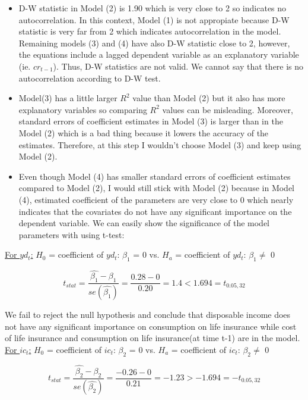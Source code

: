 \documentclass{article}
\begin{document}
\begin{itemize}
    \item D-W statistic in Model (2) is 1.90 which is very close to 2 so indicates no autocorrelation. In this context, Model (1) is not appropiate because D-W statistic is very far from 2 which indicates autocorrelation in the model. Remaining models (3) and (4) have also D-W statistic close to 2, however, the equations include a lagged dependent variable as an explanatory variable (ie. $cr_{t-1}$). Thus, D-W statistics are not valid. We cannot say that there is no autocorrelation according to D-W test. 
    \item Model(3) has a little larger $R^2$ value than Model (2) but it also has more explanatory variables so comparing $R^2$ values can be misleading. Moreover, standard errors of coefficient estimates in Model (3) is larger than in the Model (2) which is a bad thing because it lowers the accuracy of the estimates. Therefore, at this step I wouldn't choose Model (3) and keep using Model (2).
    \item Even though Model (4) has smaller standard errors of coefficient estimates compared to Model (2), I would still stick with Model (2) because in Model (4), estimated coefficient of the parameters are very close to 0 which nearly indicates that the covariates do not have any significant importance on the dependent variable. We can easily show the significance of the model parameters with using t-test:
\end{itemize}

\underline{For $yd_t$:} $H_0$ = coefficient of $yd_t$: $\beta_1$ = 0 vs. $H_a$ = coefficient of $yd_t$: $\beta_1 \neq$ 0

\begin{equation}
    t_{stat} = \frac{\hat{\beta_1} - \beta_1 }{se(\hat{\beta_1})} =  \frac{0.28 - 0 }{0.20} = 1.4 < 1.694 = t_{0.05,32}
\end{equation}

We fail to reject the null hypothesis and conclude that disposable income does not have any significant importance on consumption on life insurance while cost of life insurance and consumption on life insurance(at time t-1) are in the model.
\\

\underline{For $ic_t$:} $H_0$ = coefficient of $ic_t$: $\beta_2$ = 0 vs. $H_a$ = coefficient of $ic_t$: $\beta_2 \neq$ 0

\begin{equation}
    t_{stat} = \frac{\hat{\beta_2} - \beta_2 }{se(\hat{\beta_2})} =  \frac{-0.26 - 0 }{0.21} = - 1.23 > -1.694 = -t_{0.05,32}
\end{equation}
\end{document}
